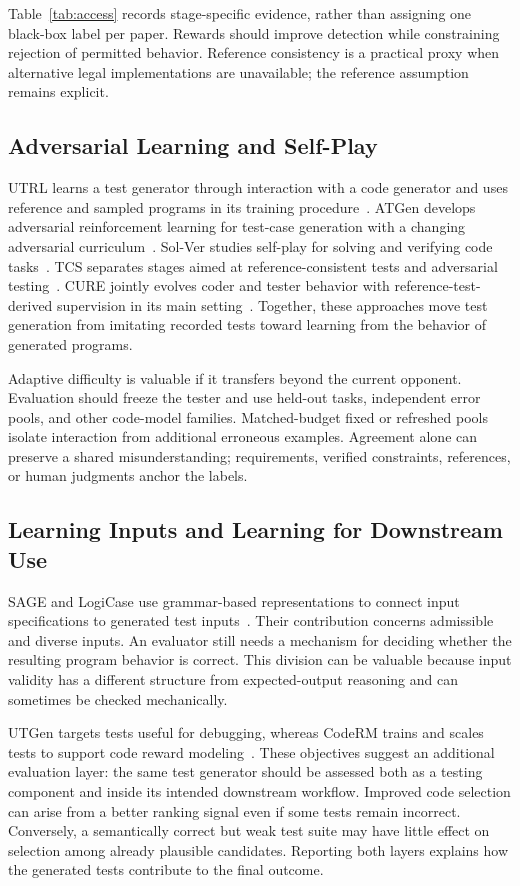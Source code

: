 Table~\ref{tab:access} records stage-specific evidence, rather than assigning one black-box label per paper. Rewards should improve detection while constraining rejection of permitted behavior. Reference consistency is a practical proxy when alternative legal implementations are unavailable; the reference assumption remains explicit.

\subsection{Adversarial Learning and Self-Play}
UTRL learns a test generator through interaction with a code generator and uses reference and sampled programs in its training procedure~\cite{T02}. ATGen develops adversarial reinforcement learning for test-case generation with a changing adversarial curriculum~\cite{T03}. Sol-Ver studies self-play for solving and verifying code tasks~\cite{T04}. TCS separates stages aimed at reference-consistent tests and adversarial testing~\cite{T07}. CURE jointly evolves coder and tester behavior with reference-test-derived supervision in its main setting~\cite{T14}. Together, these approaches move test generation from imitating recorded tests toward learning from the behavior of generated programs.

Adaptive difficulty is valuable if it transfers beyond the current opponent. Evaluation should freeze the tester and use held-out tasks, independent error pools, and other code-model families. Matched-budget fixed or refreshed pools isolate interaction from additional erroneous examples. Agreement alone can preserve a shared misunderstanding; requirements, verified constraints, references, or human judgments anchor the labels.

\subsection{Learning Inputs and Learning for Downstream Use}
SAGE and LogiCase use grammar-based representations to connect input specifications to generated test inputs~\cite{T08,T09}. Their contribution concerns admissible and diverse inputs. An evaluator still needs a mechanism for deciding whether the resulting program behavior is correct. This division can be valuable because input validity has a different structure from expected-output reasoning and can sometimes be checked mechanically.

UTGen targets tests useful for debugging, whereas CodeRM trains and scales tests to support code reward modeling~\cite{T05,T06}. These objectives suggest an additional evaluation layer: the same test generator should be assessed both as a testing component and inside its intended downstream workflow. Improved code selection can arise from a better ranking signal even if some tests remain incorrect. Conversely, a semantically correct but weak test suite may have little effect on selection among already plausible candidates. Reporting both layers explains how the generated tests contribute to the final outcome.
